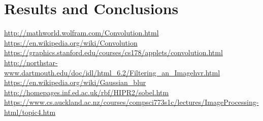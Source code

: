\documentclass{article}
\begin{document}

\section{Results and Conclusions}


\newpage

\begin{thebibliography}{1}
	 \url{http://mathworld.wolfram.com/Convolution.html}
	 \url{https://en.wikipedia.org/wiki/Convolution}
	 \url{https://graphics.stanford.edu/courses/cs178/applets/convolution.html}
	 \url{http://northstar-www.dartmouth.edu/doc/idl/html_6.2/Filtering_an_Imagehvr.html}
	 \url{https://en.wikipedia.org/wiki/Gaussian_blur}
	 \url{http://homepages.inf.ed.ac.uk/rbf/HIPR2/sobel.htm}
	 \url{https://www.cs.auckland.ac.nz/courses/compsci773s1c/lectures/ImageProcessing-html/topic4.htm}		
\end{thebibliography}

\end{document}
